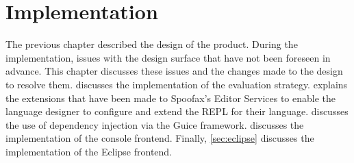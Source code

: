 \chapter{Implementation}
\label{cha:implementation}

The previous chapter described the design of the product. During the
implementation, issues with the design surface that have not been foreseen in
advance. This chapter discusses these issues and the changes made to the design
to resolve them.   discusses the implementation
of the evaluation strategy.  explains the extensions
that have been made to Spoofax's Editor Services to enable the language designer
to configure and extend the REPL for their language. 
discusses the use of dependency injection via the Guice framework.
 discusses the implementation of the console frontend.
Finally, \cref{sec:eclipse} discusses the implementation of the Eclipse
frontend.





